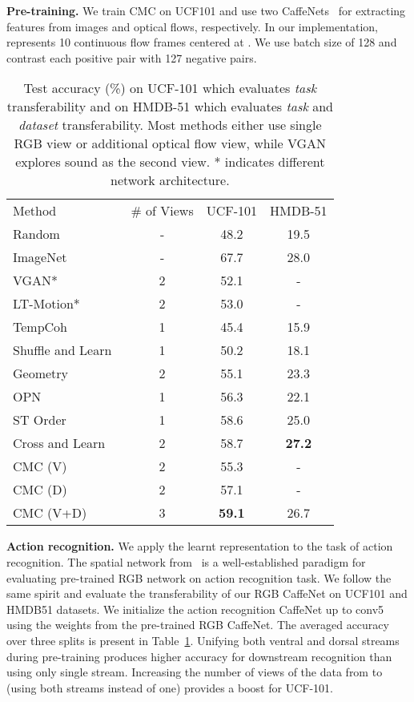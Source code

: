 \documentclass[10pt,twocolumn,letterpaper]{article}
\newcommand{\header}[1]{\vspace{0.05in}\noindent\textbf{#1}}
\newcommand{\citep}[1]{\cite{#1}}
\begin{document}
\header{Pre-training.} We train CMC on UCF101 \citep{soomro2012ucf101} and use two CaffeNets~\citep{krizhevsky2012imagenet} for extracting features from images and optical flows, respectively. In our implementation,  represents 10 continuous flow frames centered at . We use batch size of 128 and contrast each positive pair with 127 negative pairs. 

\begin{table}
	\centering
	\setlength{\tabcolsep}{3pt}
	\begin{tabular}{l|ccc}
Method & \# of Views &UCF-101 & HMDB-51\\
        \shline
		Random & - & 48.2 & 19.5 \\
		ImageNet & - & 67.7 & 28.0 \\
		\hline
		VGAN*~\citep{vondrick2016generating}  & 2 & 52.1 & - \\
		LT-Motion*~\citep{luo2017unsupervised} & 2 &53.0 & - \\
		\hline
		TempCoh~\citep{mobahi2009deep} & 1 & 45.4 & 15.9 \\
		Shuffle and Learn~\citep{misra2016shuffle} & 1 & 50.2 & 18.1\\
		Geometry~\citep{gan2018geometry} & 2 & 55.1 & 23.3 \\
		OPN~\citep{lee2017unsupervised}  & 1 & 56.3 & 22.1\\
		ST Order~\citep{buchler2018improving} & 1 & 58.6 & 25.0 \\
		Cross and Learn~\citep{sayed2018cross} & 2 & 58.7 & \textbf{27.2} \\
		\hline
		CMC (V) & 2 & 55.3 & - \\
		CMC (D) & 2 & 57.1 & - \\
		CMC (V+D)& 3 & \textbf{59.1} & 26.7 \\ 
	\end{tabular}
	\caption{\small{Test accuracy (\%) on UCF-101 which evaluates \emph{task} transferability and on HMDB-51 which evaluates \emph{task} and \emph{dataset} transferability. Most methods either use single RGB view or additional optical flow view, while VGAN explores sound as the second view. * indicates different network architecture.}}
	\vspace{-10pt}
	\label{table:actionrecognition}
\end{table} 
\header{Action recognition.} We apply the learnt representation to the task of action recognition. The spatial network from~\citep{simonyan2014two} is a well-established paradigm for evaluating pre-trained RGB network on action recognition task. We follow the same spirit and evaluate the transferability of our RGB CaffeNet on UCF101 and HMDB51 datasets. We initialize the action recognition CaffeNet up to conv5 using the weights from the pre-trained RGB CaffeNet. The averaged accuracy over three splits is present in Table~\ref{table:actionrecognition}. Unifying both ventral and dorsal streams during pre-training produces higher accuracy for downstream recognition than using only single stream. Increasing the number of views of the data from  to  (using both streams instead of one) provides a boost for UCF-101. 
\end{document}
